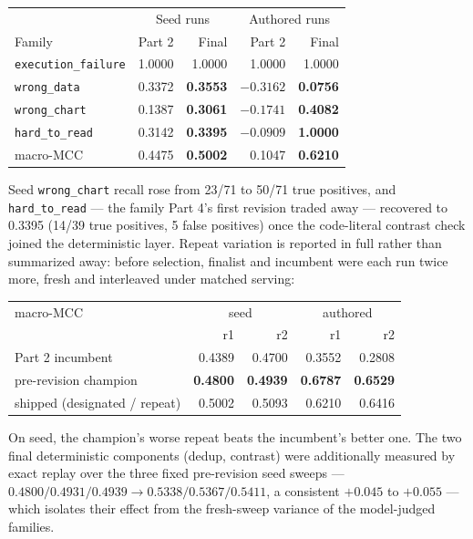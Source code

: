 \documentclass[11pt]{article}
\begin{document}
\begin{center}
\begin{tabular}{lrrrr}
\toprule
& \multicolumn{2}{c}{Seed runs} & \multicolumn{2}{c}{Authored runs} \\
Family & Part 2 & Final & Part 2 & Final \\
\midrule
\texttt{execution\_failure} & 1.0000 & 1.0000 & 1.0000 & 1.0000 \\
\texttt{wrong\_data} & 0.3372 & \textbf{0.3553} & $-0.3162$ & \textbf{0.0756} \\
\texttt{wrong\_chart} & 0.1387 & \textbf{0.3061} & $-0.1741$ & \textbf{0.4082} \\
\texttt{hard\_to\_read} & 0.3142 & \textbf{0.3395} & $-0.0909$ & \textbf{1.0000} \\
\midrule
macro-MCC & 0.4475 & \textbf{0.5002} & 0.1047 & \textbf{0.6210} \\
\bottomrule
\end{tabular}
\end{center}

Seed \texttt{wrong\_chart} recall rose from 23/71 to 50/71 true
positives, and \texttt{hard\_to\_read} --- the family Part 4's first
revision traded away --- recovered to 0.3395 (14/39 true positives, 5
false positives) once the code-literal contrast check joined the
deterministic layer. Repeat variation is reported in full rather than summarized
away: before selection, finalist and incumbent were each run twice more,
fresh and interleaved under matched serving:

\begin{center}
\begin{tabular}{lrrrr}
\toprule
macro-MCC & \multicolumn{2}{c}{seed} & \multicolumn{2}{c}{authored} \\
 & r1 & r2 & r1 & r2 \\
\midrule
Part 2 incumbent & 0.4389 & 0.4700 & 0.3552 & 0.2808 \\
pre-revision champion & \textbf{0.4800} & \textbf{0.4939} & \textbf{0.6787} & \textbf{0.6529} \\
shipped (designated / repeat) & 0.5002 & 0.5093 & 0.6210 & 0.6416 \\
\bottomrule
\end{tabular}
\end{center}

On seed, the champion's worse repeat beats the incumbent's better one.
The two final deterministic components (dedup, contrast) were
additionally measured by exact replay over the three fixed pre-revision
seed sweeps --- $0.4800/0.4931/0.4939 \to 0.5338/0.5367/0.5411$, a
consistent $+0.045$ to $+0.055$ --- which isolates their effect from the
fresh-sweep variance of the model-judged families.
\end{document}
